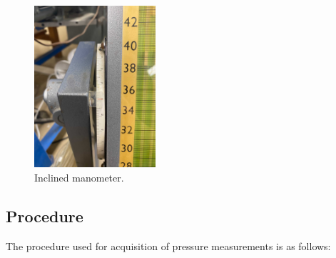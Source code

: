 \documentclass[runningheads]{llncs}
\begin{document}
\begin{figure}[h]
    \centering
    \includegraphics[width=0.4\textwidth]{Apparatus Pictures/inclined_manometer_slope_graduations.jpg}
    \caption{Inclined manometer.}
    \label{fig:manometer}
\end{figure}

\subsection{Procedure}\label{sec:procedure}


The procedure used for acquisition of pressure measurements is as follows:
\end{document}
